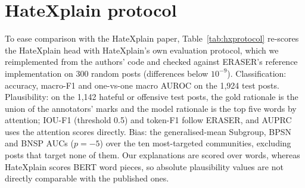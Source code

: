 \documentclass[preprint,12pt,authoryear]{elsarticle}
\begin{document}
\appendix
\section{HateXplain protocol}
\label{app:hatexplain}
To ease comparison with the HateXplain paper, Table~\ref{tab:hxprotocol} re-scores the HateXplain head with HateXplain's own evaluation protocol, which we reimplemented from the authors' code and checked against ERASER's reference implementation on 300 random posts (differences below $10^{-9}$). Classification: accuracy, macro-F1 and one-vs-one macro AUROC on the 1{,}924 test posts. Plausibility: on the 1{,}142 hateful or offensive test posts, the gold rationale is the union of the annotators' marks and the model rationale is the top five words by attention; IOU-F1 (threshold 0.5) and token-F1 follow ERASER, and AUPRC uses the attention scores directly. Bias: the generalised-mean Subgroup, BPSN and BNSP AUCs ($p=-5$) over the ten most-targeted communities, excluding posts that target none of them. Our explanations are scored over words, whereas HateXplain scores BERT word pieces, so absolute plausibility values are not directly comparable with the published ones.
\end{document}
